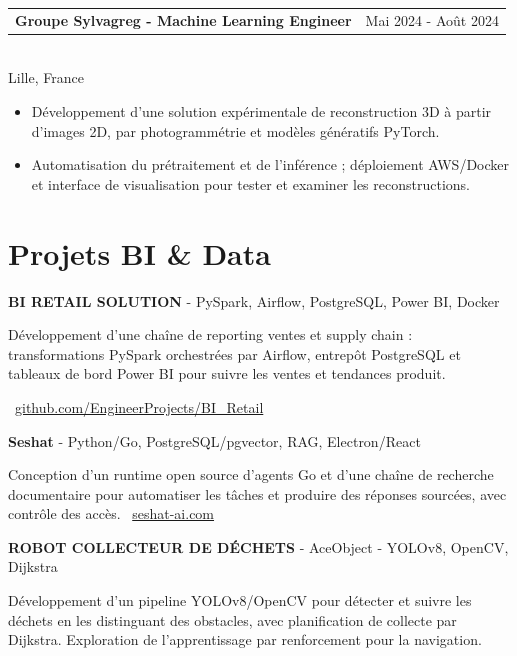 \documentclass[10pt,a4paper]{article}
\makeatletter
\newcommand{\role}[3]{%
  \vspace{3pt}
  \begin{tabularx}{\linewidth}{@{}Xr@{}}
  \textbf{#1} & {\color{muted}#2}
  \end{tabularx}\vspace{0.8pt}\\
  {\color{muted}#3}\par
  \vspace{3pt}
}
\newcommand{\projectline}[2]{%
  \textbf{#1} - #2\par
}
\newcommand{\githublink}[2]{%
  \par{\footnotesize\color{accent}\faIcon{github}\ \href{#1}{#2}}\par
}
\newlength{\maincolumnheight}
\makeatother
\begin{document}
\begin{lrbox}{\maincolumnbox}
\begin{minipage}[t]{0.695\textwidth}
\vspace{8pt}
\role{Groupe Sylvagreg - Machine Learning Engineer}{Mai 2024 - Août 2024}{Lille, France}
\begin{itemize}
  \item Développement d'une solution expérimentale de reconstruction 3D à partir d'images 2D, par photogrammétrie et modèles génératifs PyTorch.
  \item Automatisation du prétraitement et de l'inférence ; déploiement AWS/Docker et interface de visualisation pour tester et examiner les reconstructions.
\end{itemize}

\section{Projets BI \& Data}
\projectline{BI RETAIL SOLUTION}{PySpark, Airflow, PostgreSQL, Power BI, Docker}
Développement d'une chaîne de reporting ventes et supply chain : transformations PySpark orchestrées par Airflow, entrepôt PostgreSQL et tableaux de bord Power BI pour suivre les ventes et tendances produit.
\githublink{https://github.com/EngineerProjects/BI_Retail}{github.com/EngineerProjects/BI\_Retail}

\vspace{7pt}
\projectline{Seshat}{Python/Go, PostgreSQL/pgvector, RAG, Electron/React}
Conception d'un runtime open source d'agents Go et d'une chaîne de recherche documentaire pour automatiser les tâches et produire des réponses sourcées, avec contrôle des accès.
{\footnotesize\color{accent}\ \href{https://seshat-ai.com}{seshat-ai.com}}\par

\vspace{7pt}
\projectline{ROBOT COLLECTEUR DE DÉCHETS}{AceObject - YOLOv8, OpenCV, Dijkstra}
Développement d'un pipeline YOLOv8/OpenCV pour détecter et suivre les déchets en les distinguant des obstacles, avec planification de collecte par Dijkstra. Exploration de l'apprentissage par renforcement pour la navigation.

\end{minipage}
\end{lrbox}
\setlength{\maincolumnheight}{\dimexpr\ht\maincolumnbox+\dp\maincolumnbox\relax}
\addtolength{\maincolumnheight}{45pt}
\end{document}
